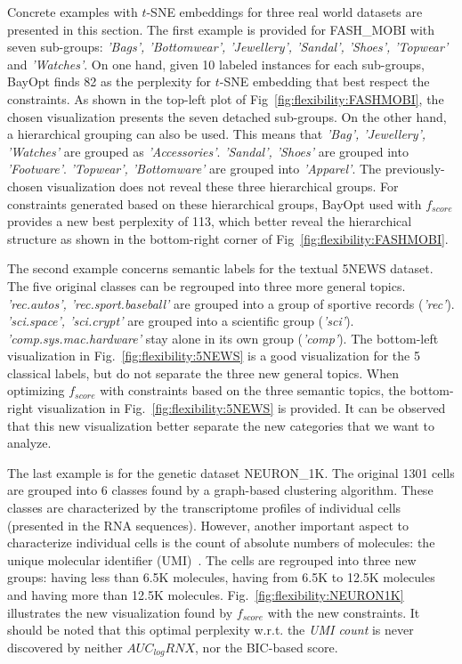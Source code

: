 Concrete examples with $t$-SNE embeddings for three real world datasets are presented in this section.
The first example is provided for {FASH\_MOBI} with seven sub-groups: \emph{'Bags', 'Bottomwear', 'Jewellery', 'Sandal', 'Shoes', 'Topwear'} and \emph{'Watches'}.
On one hand, given 10 labeled instances for each sub-groups, BayOpt finds 82 as the perplexity for $t$-SNE embedding that best respect the constraints.
As shown in the top-left plot of Fig~\ref{fig:flexibility:FASHMOBI}, the chosen visualization presents the seven detached sub-groups.
On the other hand, a hierarchical grouping can also be used.
This means that \emph{'Bag', 'Jewellery', 'Watches'} are grouped as \emph{'Accessories'}.
\emph{'Sandal', 'Shoes'} are grouped into \emph{'Footware'}.
\emph{'Topwear', 'Bottomware'} are grouped into \emph{'Apparel'}.
The previously-chosen visualization does not reveal these three hierarchical groups.
For constraints generated based on these hierarchical groups, BayOpt used with $f_{score}$ provides a new best perplexity of 113, which better reveal the hierarchical structure as shown in the bottom-right corner of Fig~\ref{fig:flexibility:FASHMOBI}.

The second example concerns semantic labels for the textual 5NEWS dataset.
The five original classes can be regrouped into three more general topics.
\emph{'rec.autos', 'rec.sport.baseball'} are grouped into a group of sportive records (\emph{'rec'}).
\emph{'sci.space', 'sci.crypt'} are grouped into a scientific group (\emph{'sci'}).
\emph{'comp.sys.mac.hardware'} stay alone in its own group (\emph{'comp'}).
The bottom-left visualization in Fig.~\ref{fig:flexibility:5NEWS} is a good visualization for the 5 classical labels, but do not separate the three new general topics. When optimizing $f_{score}$ with constraints based on the three semantic topics, the bottom-right visualization in Fig.~\ref{fig:flexibility:5NEWS} is provided. It can be observed that this new visualization better separate the new categories that we want to analyze.

The last example is for the genetic dataset NEURON\_1K.
The original 1301 cells are grouped into 6 classes found by a graph-based clustering algorithm.
These classes are characterized by the transcriptome profiles of individual cells (presented in the RNA sequences).
However, another important aspect to characterize individual cells is the count of absolute numbers of molecules: the unique molecular identifier (UMI)~\cite{kivioja2011counting}. 
The cells are regrouped into three new groups: having less than 6.5K molecules, having from 6.5K to 12.5K molecules and having more than 12.5K molecules.
Fig.~\ref{fig:flexibility:NEURON1K} illustrates the new visualization found by $f_{score}$ with the new constraints.
It should be noted that this optimal perplexity w.r.t. the \emph{UMI count} is never discovered by neither $AUC_{log}RNX$, nor the BIC-based score.

